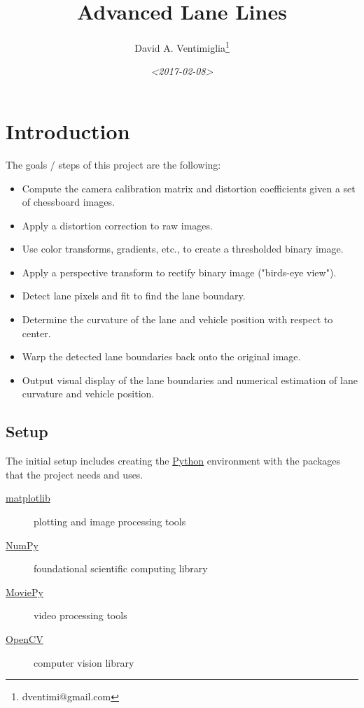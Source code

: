 \documentclass[11pt]{article}
\author{David A. Ventimiglia\thanks{dventimi@gmail.com}}
\date{\textit{<2017-02-08>}}
\title{Advanced Lane Lines}
\begin{document}
\maketitle


\section*{Introduction}
\label{sec-1}

The goals / steps of this project are the following:

\begin{itemize}
\item Compute the camera calibration matrix and distortion coefficients
given a set of chessboard images.
\item Apply a distortion correction to raw images.
\item Use color transforms, gradients, etc., to create a thresholded
binary image.
\item Apply a perspective transform to rectify binary image ("birds-eye
view").
\item Detect lane pixels and fit to find the lane boundary.
\item Determine the curvature of the lane and vehicle position with
respect to center.
\item Warp the detected lane boundaries back onto the original image.
\item Output visual display of the lane boundaries and numerical
estimation of lane curvature and vehicle position.
\end{itemize}

\subsection*{Setup}
\label{sec-1-1}

The initial setup includes creating the \href{https://www.python.org/}{Python} environment with
the packages that the project needs and uses.

\begin{description}
\item[{\href{http://matplotlib.org/}{matplotlib}}] plotting and image processing tools
\item[{\href{http://www.numpy.org/}{NumPy}}] foundational scientific computing library
\item[{\href{http://zulko.github.io/moviepy/}{MoviePy}}] video processing tools
\item[{\href{http://opencv.org/}{OpenCV}}] computer vision library
\end{description}
\end{document}
